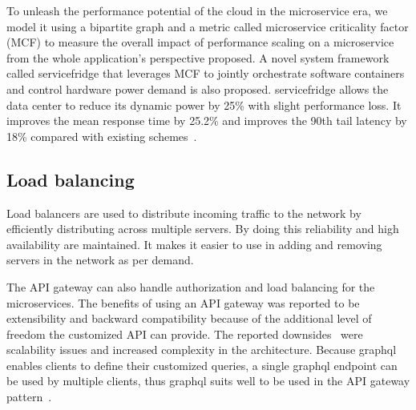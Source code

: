 \par To unleash the performance potential of the cloud in the microservice era, we model it using a bipartite graph and a metric called microservice criticality factor (MCF) to measure the overall impact of performance scaling on a microservice from the whole application's perspective proposed. A novel system framework called servicefridge that leverages MCF to jointly orchestrate software containers and control hardware power demand is also proposed. servicefridge allows the data center to reduce its dynamic power by 25\% with slight performance loss. It improves the mean response time by 25.2\% and improves the 90th tail latency by 18\% compared with existing schemes~\cite{Hou2019}.


\subsection{Load balancing}%
Load balancers are used to distribute incoming traffic to the network by efficiently distributing across multiple servers. By doing this reliability and high availability are maintained. It makes it easier to use in adding and removing servers in the network as per demand. 

\par The API gateway can also handle authorization and load balancing for the microservices. The benefits of using an API gateway was reported to be extensibility and backward compatibility because of the additional level of freedom the customized API can provide. The reported downsides~\cite{Taibi2019} were scalability issues and increased complexity in the architecture. Because graphql enables clients to define their customized queries, a single graphql endpoint can be used by multiple clients, thus graphql suits well to be used in the API gateway pattern~\cite{Ville2019}.

